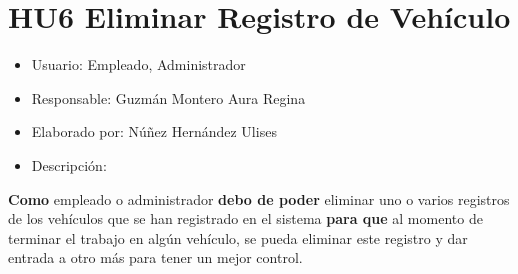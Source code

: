 \section{HU6 Eliminar Registro de Vehículo}
\begin{itemize}
	\item Usuario: Empleado, Administrador
	\item Responsable: Guzmán Montero Aura Regina
	\item Elaborado por: Núñez Hernández Ulises
	\item Descripción:\\
\end{itemize}

\textbf{Como} empleado o administrador \textbf{debo de poder} eliminar uno o varios registros de los vehículos que se han registrado en el sistema \textbf{para que} al momento de terminar el trabajo en algún vehículo, se pueda eliminar este registro y dar entrada a otro más para tener un mejor control. 